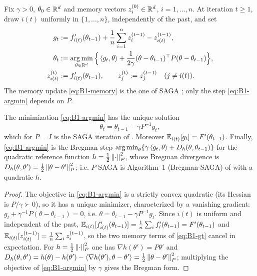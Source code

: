 \begin{definition}\label{def:B1-PSAGA}
Fix $\gamma>0$, $\theta_0\in\mathbb{R}^d$ and memory vectors $z_i^{(0)}\in\mathbb{R}^d$, $i=1,\dots,n$. At iteration
$t\ge1$, draw $i(t)$ uniformly in $\{1,\dots,n\}$, independently of the past, and set
\begin{align}
g_t&:=f'_{i(t)}(\theta_{t-1})+\frac1n\sum_{i=1}^n z_i^{(t-1)}-z_{i(t)}^{(t-1)},\label{eq:B1-gt}\\
\theta_t&:=\operatorname*{arg\,min}_{\theta\in\mathbb{R}^d}\Big\{\left\langle g_t, \theta \right\rangle
+\frac1{2\gamma}(\theta-\theta_{t-1})^\top P(\theta-\theta_{t-1})\Big\},\label{eq:B1-argmin}\\
z_{i(t)}^{(t)}&:=f'_{i(t)}(\theta_{t-1}),\qquad z_j^{(t)}:=z_j^{(t-1)}\quad(j\neq i(t)).\label{eq:B1-memory}
\end{align}
The memory update \eqref{eq:B1-memory} is the one of SAGA \cite{defazio2014saga}; only the step
\eqref{eq:B1-argmin} depends on $P$.
\end{definition}

\begin{lemma}\label{lem:B1-step}
The minimization \eqref{eq:B1-argmin} has the unique solution
\begin{equation}\label{eq:B1-step}
\theta_t=\theta_{t-1}-\gamma P^{-1}g_t ,
\end{equation}
which for $P=I$ is the SAGA iteration of \cite[Sec.~5.4.4]{bach2024learning}. Moreover
$\mathbb{E}_{i(t)}[g_t]=F'(\theta_{t-1})$. Finally, \eqref{eq:B1-argmin} is the Bregman step
$\operatorname*{arg\,min}_\theta\{\gamma\left\langle g_t, \theta \right\rangle+D_h(\theta,\theta_{t-1})\}$ for the quadratic reference function
$h=\frac12\left\|\cdot\right\|_P^2$, whose Bregman divergence is $D_h(\theta,\theta')=\frac12\left\|\theta-\theta'\right\|_P^2$;
i.e. $P$-SAGA is Algorithm~1 (Bregman-SAGA) of \cite{dragomir2021fast} with a quadratic $h$.
\end{lemma}
\begin{proof}
The objective in \eqref{eq:B1-argmin} is a strictly convex quadratic (its Hessian is $P/\gamma\succ0$), so
it has a unique minimizer, characterized by a vanishing gradient: $g_t+\gamma^{-1}P(\theta-\theta_{t-1})=0$,
i.e. $\theta=\theta_{t-1}-\gamma P^{-1}g_t$. Since $i(t)$ is uniform and independent of the past,
$\mathbb{E}_{i(t)}[f'_{i(t)}(\theta_{t-1})]=\frac1n\sum_if'_i(\theta_{t-1})=F'(\theta_{t-1})$ and
$\mathbb{E}_{i(t)}[z_{i(t)}^{(t-1)}]=\frac1n\sum_i z_i^{(t-1)}$, so the two memory terms of \eqref{eq:B1-gt} cancel in
expectation. For $h=\frac12\left\|\cdot\right\|_P^2$ one has $\nabla h(\theta')=P\theta'$ and
$D_h(\theta,\theta')=h(\theta)-h(\theta')-\left\langle \nabla h(\theta'), \theta-\theta' \right\rangle
=\frac12\left\|\theta-\theta'\right\|_P^2$; multiplying the objective of \eqref{eq:B1-argmin} by $\gamma$ gives the
Bregman form.
\end{proof}


